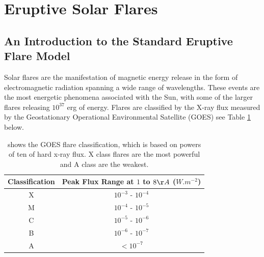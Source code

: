 \section{Eruptive Solar Flares}
\subsection{An Introduction to the Standard Eruptive Flare Model} 

Solar flares are the manifestation of magnetic energy release in the form of electromagnetic radiation spanning a wide range of wavelengths. These events are the most energetic phenomena associated with the Sun, with some of the larger flares releasing $10^{37}$ erg of energy. Flares are classified by the X-ray flux measured by the Geostationary Operational Environmental Satellite (GOES) see Table \ref{goes} below. \\

\begin{table}[h]
\centering
\begin{tabular}{|c|c|}\label{GOES}
Classification & Peak Flux Range at $1$ to $8\AA$ ($W.m^{-2}$)\\ 
\hline
X & $10^{-3}$ - $10^{-4}$\\ 
M & $10^{-4}$ - $10^{-5}$\\ 
C & $10^{-5}$ - $10^{-6}$\\ 
B & $10^{-6}$ - $10^{-7}$\\ 
A & $<10^{-7}$\\  
\end{tabular}
\caption{shows the GOES flare classification, which is based on powers of ten of hard x-ray flux. X class flares are the most powerful and A class are the weakest.}\label{goes}
\end{table}

